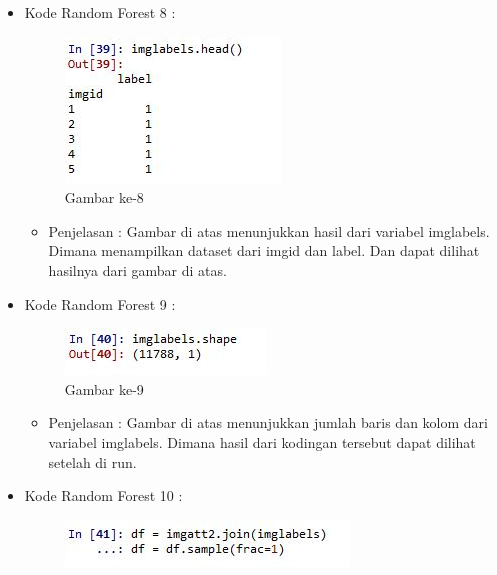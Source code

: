 \begin{enumerate}
\begin{itemize}
\begin{itemize}
\begin{itemize}
\begin{itemize}
\par
\par
\end{itemize}
\item Kode Random Forest 8 :
\par
\begin{figure}[ht]
\centering
\includegraphics[scale=0.2]{figures/hmm/cod8.jpg}
\caption{Gambar ke-8}
\label{contoh}
\end{figure}
\par
\begin{itemize}
\item Penjelasan : Gambar di atas menunjukkan hasil dari variabel imglabels. Dimana menampilkan dataset dari imgid dan label. Dan dapat dilihat hasilnya dari gambar di atas.
\par
\par
\end{itemize}
\item Kode Random Forest 9 :
\par
\begin{figure}[ht]
\centering
\includegraphics[scale=0.7]{figures/hmm/cod9.jpg}
\caption{Gambar ke-9}
\label{contoh}
\end{figure}
\par
\begin{itemize}
\item Penjelasan : Gambar di atas menunjukkan jumlah baris dan kolom dari variabel imglabels. Dimana hasil dari kodingan tersebut dapat dilihat setelah di run. 
\par
\par
\end{itemize}
\item Kode Random Forest 10 :
\par
\begin{figure}[ht]
\centering
\includegraphics[scale=0.7]{figures/hmm/cod10.jpg}

\end{figure}
\end{itemize}
\end{itemize}
\end{itemize}
\end{enumerate}
